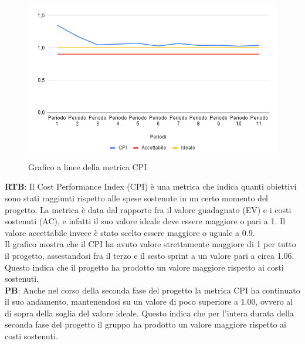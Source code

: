 \documentclass[10pt]{article}
\begin{document}
\begin{justify}
\begin{figure}[H]
  \centering
  \includegraphics[width=0.9\linewidth]{CPI.png}
  \caption{Grafico a linee della metrica CPI}
  \label{fig:CPIchart}
\end{figure}

\textbf{RTB}: Il Cost Performance Index (CPI) è una metrica che indica quanti obiettivi sono stati raggiunti rispetto alle spese sostenute in un certo momento del
progetto. La metrica è data dal rapporto fra il valore guadagnato (EV) e i costi sostenuti (AC), e infatti il suo valore ideale deve essere maggiore o pari a 1.
Il valore accettabile invece è stato scelto essere maggiore o uguale a 0.9.\\
Il grafico mostra che il CPI ha avuto valore strettamente maggiore di 1 per tutto il progetto, assestandosi fra il terzo e il sesto sprint a un valore pari a circa 1.06.
Questo indica che il progetto ha prodotto un valore maggiore rispetto ai costi sostenuti.\\

\noindent
\textbf{PB}: Anche nel corso della seconda fase del progetto la metrica CPI ha continuato il suo andamento, mantenendosi su un valore di poco superiore a 1.00, ovvero 
al di sopra della soglia del valore ideale. Questo indica che per l'intera durata della seconda fase del progetto il gruppo ha prodotto un valore maggiore rispetto ai 
costi sostenuti.\\



\end{justify}
\end{document}

